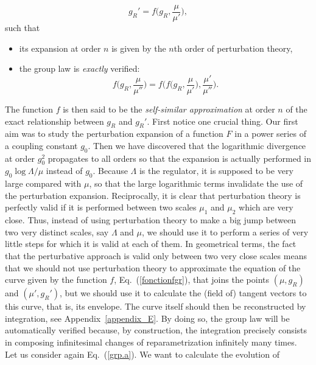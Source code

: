 \documentclass[floatfix,preprintnumbers,amsmath,amssymb,prb,12pt]{revtex4-1}
\begin{document}
\begin{equation}
g_R'= f\big(g_R,\frac{\mu}{\mu'}\big),
\label{fonctionfgr}
\end{equation}
such that 
\begin{itemize}

\item its expansion at order $n$ is given by the $n$th order of
perturbation theory, 

\item the group law is {\it exactly} verified:
\begin{equation}
f\big(g_R,\frac{\mu}{\mu''}\big)=
f\big(f\big(g_R,\frac{\mu}{\mu'}\big),\frac{\mu'}{\mu''}\big).
\label{grouplaw}
\end{equation}
\end{itemize}
The function $f$ is then said to be the {\em self-similar
approximation} at order $n$ of the exact relationship between
$g_R$ and $g_R'$.\cite{kovalev99} First notice one crucial thing.
Our first aim was to study the perturbation expansion of a
function $F$ in a power series of a coupling constant $g_0$. Then
we have discovered that the logarithmic divergence at order
$g_0^2$ propagates to all orders so that the expansion is actually
performed in $g_0 \log\Lambda/\mu$ instead of $g_0$. Because
$\Lambda$ is the regulator, it is supposed to be very large
compared with $\mu$, so that the large logarithmic terms
invalidate the use of the perturbation expansion. Reciprocally, it
is clear that perturbation theory is perfectly valid if it is
performed between two scales $\mu_1$ and $\mu_2$ which are very
close. Thus, instead of using perturbation theory to make a big
jump between two very distinct scales, say $\Lambda$ and $\mu$, we
should use it to perform a series of very little steps for which
it is valid at each of them. In geometrical terms, the fact that
the perturbative approach is valid only between two very close scales
 means that we should not use perturbation theory to
approximate the equation of the curve given by the function $f$,
Eq.~(\ref{fonctionfgr}), that joins the points $(\mu,g_R)$ and
$(\mu',g_R')$, but we should use it to calculate the (field of)
tangent vectors to this curve, that is, its envelope. The curve
itself should then be reconstructed by integration, see
Appendix~\ref{appendix_E}. By doing so, the group law will be
automatically verified because, by construction, the integration
precisely consists in composing infinitesimal changes of
reparametrization infinitely many times. Let us consider again
Eq.~(\ref{grp.a}). We want to calculate the evolution of 
\end{document}
